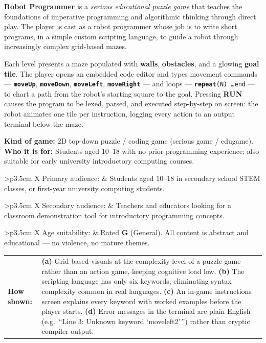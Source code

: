 \documentclass[12pt,a4paper]{article}
\newcommand{\keyword}[1]{\textcolor{keyword}{\texttt{\bfseries #1}}}
\newcommand{\gddfield}[2]{%
  \noindent\begin{tabularx}{\linewidth}{>{\bfseries\color{accent}\sffamily}p{3.5cm} X}
    #1 & #2
  \end{tabularx}\smallskip}
\begin{document}
\vspace{6pt}

\begin{tcolorbox}[gddbox, title={Game Description}]
\textbf{Robot Programmer} is a \emph{serious educational puzzle game} that teaches the foundations of imperative programming and algorithmic thinking through direct play. The player is cast as a robot programmer whose job is to write short programs, in a simple custom scripting language, to guide a robot through increasingly complex grid-based mazes.

\vspace{6pt}
Each level presents a maze populated with \textbf{walls}, \textbf{obstacles}, and a glowing \textbf{goal tile}. The player opens an embedded code editor and types movement commands — \keyword{moveUp}, \keyword{moveDown}, \keyword{moveLeft}, \keyword{moveRight} — and loops — \keyword{repeat}\texttt{(N) \ldots end} — to chart a path from the robot's starting square to the goal. Pressing \textbf{RUN} causes the program to be lexed, parsed, and executed step-by-step on screen: the robot animates one tile per instruction, logging every action to an output terminal below the maze.

\vspace{6pt}
\textbf{Kind of game:} 2D top-down puzzle / coding game (serious game / edugame).\\
\textbf{Who it is for:} Students aged 10--18 with no prior programming experience; also suitable for early university introductory computing courses.
\end{tcolorbox}

\vspace{6pt}

\begin{tcolorbox}[gddbox, title={Audience}]
\gddfield{Primary audience:}{Students aged 10--18 in secondary school STEM classes, or first-year university computing students.}
\gddfield{Secondary audience:}{Teachers and educators looking for a classroom demonstration tool for introductory programming concepts.}
\gddfield{Age suitability:}{Rated \textbf{G} (General). All content is abstract and educational — no violence, no mature themes.}
\gddfield{How shown:}{%
  \textbf{(a)} Grid-based visuals at the complexity level of a puzzle game rather than an action game, keeping cognitive load low.
  \textbf{(b)} The scripting language has only six keywords, eliminating syntax complexity common in real languages.
  \textbf{(c)} An in-game instructions screen explains every keyword with worked examples before the player starts.
  \textbf{(d)} Error messages in the terminal are plain English (e.g.\ ``Line 3: Unknown keyword `moveleft2'\,'') rather than cryptic compiler output.
}
\end{tcolorbox}
\end{document}
